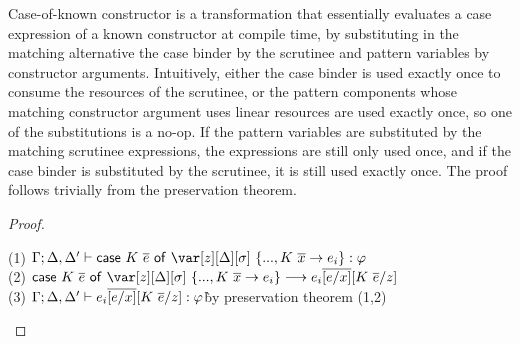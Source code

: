 Case-of-known constructor is a transformation that essentially evaluates a case
expression of a known constructor at compile time, by substituting in the
matching alternative the case binder by the scrutinee and pattern variables by
constructor arguments.
%
Intuitively, either the case binder is used exactly once to consume the
resources of the scrutinee, or the pattern components whose matching
constructor argument uses linear resources are used exactly once, so one of the
substitutions is a no-op.  If the pattern variables are substituted by the
matching scrutinee expressions, the expressions are still only used once, and
if the case binder is substituted by the scrutinee, it is still used exactly
once.
%
The proof follows trivially from the preservation theorem.


\CaseOfKnownConstructorTheorem

\begin{proof}~
\begin{tabbing}
    (1) $\G; \D, \D' \vdash \ccase{K~\ov{e}}{\z[\D][\s]~\{..., K~\ov{x} \to e_i\}} : \vp$\\
    (2) $\ccase{K~\ov{e}}{\z[\D][\s]~\{..., K~\ov{x} \to e_i\}} \longrightarrow e_i\ov{[e/x]}[K~\ov{e}/z]$\\
    (3) $\Gamma; \Delta,\Delta' \vdash e_i\overline{[e/x]}[K~\overline{e}/z] : \varphi$\` by preservation theorem (1,2)\\
\end{tabbing}
\end{proof}


